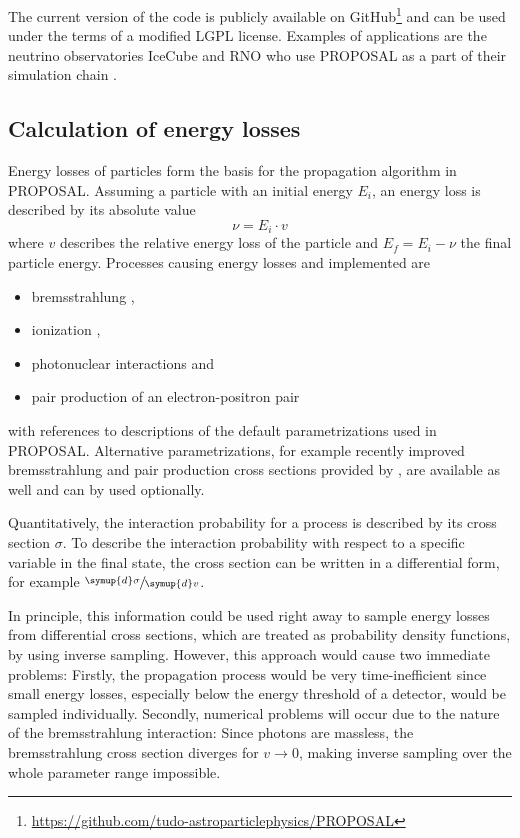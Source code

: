 The current version of the code is publicly available on GitHub\footnote{\url{https://github.com/tudo-astroparticlephysics/PROPOSAL}} and can be used under the terms of a modified LGPL license.
Examples of applications are the neutrino observatories IceCube and RNO who use PROPOSAL as a part of their simulation chain \cite{Khokhlov:2019pgh}.

\subsection{Calculation of energy losses}
\label{sec:energy_loss_calculation}

Energy losses of particles form the basis for the propagation algorithm in PROPOSAL.
Assuming a particle with an initial energy $E_i$, an energy loss is described by its absolute value
\begin{equation}
	\nu = E_i \cdot v
\end{equation}
%
where $v$ describes the relative energy loss of the particle and $E_f = E_i - \nu$ the final particle energy.
Processes causing energy losses and implemented are
%
\begin{itemize}
	\item bremsstrahlung \cite{brems_default},
	\item ionization \cite{Rossi:99081, PhysRevD.98.030001},
	\item photonuclear interactions \cite{abramowicz1997allm, butkevich2001crosssection} and
	\item pair production of an electron-positron pair \cite{epair_correction, osti_4563918}
\end{itemize}
%
with references to descriptions of the default parametrizations used in PROPOSAL.
Alternative parametrizations, for example recently improved bremsstrahlung and pair production cross sections provided by \cite{Soedingrekso:2019qlr}, are available as well and can by used optionally.

Quantitatively, the interaction probability for a process is described by its cross section $\sigma$.
To describe the interaction probability with respect to a specific variable in the final state, the cross section can be written in a differential form, for example $\sfrac{\symup{d}\sigma}{\symup{d}v}$.

In principle, this information could be used right away to sample energy losses from differential cross sections, which are treated as probability density functions, by using inverse sampling.
However, this approach would cause two immediate problems:
Firstly, the propagation process would be very time-inefficient since small energy losses, especially below the energy threshold of a detector, would be sampled individually.
Secondly, numerical problems will occur due to the nature of the bremsstrahlung interaction:
Since photons are massless, the bremsstrahlung cross section diverges for $v \to 0$, making inverse sampling over the whole parameter range impossible.

